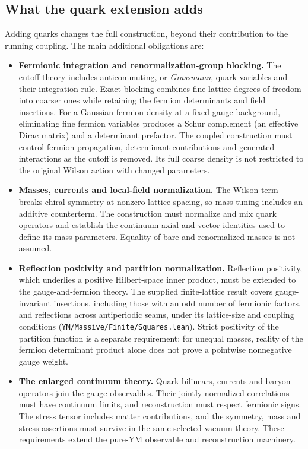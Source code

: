 \documentclass[
  11pt,
]{article}
\providecommand{\tightlist}{%
  \setlength{\itemsep}{0pt}\setlength{\parskip}{0pt}}
\begin{document}
\subsection{What the quark extension
adds}\label{what-the-quark-extension-adds}

Adding quarks changes the full construction, beyond their contribution
to the running coupling. The main additional obligations are:

\begin{itemize}
\tightlist
\item
  \textbf{Fermionic integration and renormalization-group blocking.} The
  cutoff theory includes anticommuting, or \emph{Grassmann}, quark
  variables and their integration rule. Exact blocking combines fine
  lattice degrees of freedom into coarser ones while retaining the
  fermion determinants and field insertions. For a Gaussian fermion
  density at a fixed gauge background, eliminating fine fermion
  variables produces a Schur complement (an effective Dirac matrix) and
  a determinant prefactor. The coupled construction must control fermion
  propagation, determinant contributions and generated interactions as
  the cutoff is removed. Its full coarse density is not restricted to
  the original Wilson action with changed parameters.
\item
  \textbf{Masses, currents and local-field normalization.} The Wilson
  term breaks chiral symmetry at nonzero lattice spacing, so mass tuning
  includes an additive counterterm. The construction must normalize and
  mix quark operators and establish the continuum axial and vector
  identities used to define its mass parameters. Equality of bare and
  renormalized masses is not assumed.
\item
  \textbf{Reflection positivity and partition normalization.} Reflection
  positivity, which underlies a positive Hilbert-space inner product,
  must be extended to the gauge-and-fermion theory. The supplied
  finite-lattice result covers gauge-invariant insertions, including
  those with an odd number of fermionic factors, and reflections across
  antiperiodic seams, under its lattice-size and coupling conditions
  ({\small \nolinkurl{YM/Massive/Finite/Squares.lean}}). Strict
  positivity of the partition function is a separate requirement: for
  unequal masses, reality of the fermion determinant product alone does
  not prove a pointwise nonnegative gauge weight.
\item
  \textbf{The enlarged continuum theory.} Quark bilinears, currents and
  baryon operators join the gauge observables. Their jointly normalized
  correlations must have continuum limits, and reconstruction must
  respect fermionic signs. The stress tensor includes matter
  contributions, and the symmetry, mass and stress assertions must
  survive in the same selected vacuum theory. These requirements extend
  the pure-YM observable and reconstruction machinery.
\end{itemize}
\end{document}
